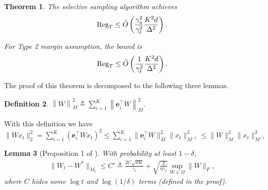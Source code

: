 \documentclass{article}
\newcommand{\Reg}{\text{\rm Reg}}
\newcommand{\e}{\mathbf{e}}
\newcommand{\norm}[1]{\left\|{#1}\right\|}
\newtheorem{theorem}{Theorem}
\newtheorem{lemma}[theorem]{Lemma}
\newtheorem{definition}[theorem]{Definition}
\begin{document}
\begin{theorem}
\label{lemma:new main}
The selective sampling algorithm achieves
\begin{align*}
    \Reg_T\leq \tilde{O}\left( \frac{\gamma_u^2}{\gamma_\ell^2}\frac{K^2d}{\Delta^2} \right). 
\end{align*}
{\color{blue} For Type 2 margin assumption, the bound is
\begin{align*}
    \Reg_T \leq \tilde{O}\left(\frac{1}{\gamma_\ell^2}\frac{K^2d}{\Delta^2}\right).
\end{align*}

}
\end{theorem}

The proof of this theorem is decomposed to the following three lemmas. 

\begin{definition}
$\norm{W}_{M}^2\triangleq \sum_{i=1}^K \norm{\e_i^\top W}_{M}^2$.
\end{definition}
With this definition we have $\|Wx_t\|_2^2 = \sum_{i=1}^K (\e_i^\top Wx_t)^2 \leq \sum_{i=1}^K \|\e_i^\top W\|_M^2 \|x_t\|_{M^{-1}}^2\leq \|W\|_M^2 \|x_t\|_{M^{-1}}^2$


\begin{lemma}[Proposition 1 of \cite{agarwal2013selective}]
\label{lem:decreasing error}
With probability at least $1-\delta$,
\begin{align*}
\|W_t-W^*\|_{M_t} \leq C' \triangleq \frac{2C\sqrt{dK}}{\gamma_\ell} + \sqrt{\frac{2}{\eta \gamma_\ell}}\sup_{W\in \Omega}\|W\|_F, 
\end{align*}
where $C$ hides some $\log t$ and $\log(1/\delta)$ terms (defined in the proof). 
\end{lemma}
\end{document}
